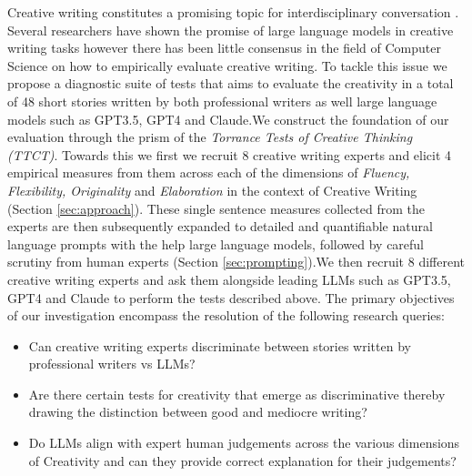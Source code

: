 Creative writing constitutes a promising topic for interdisciplinary conversation \cite{Doyle1998TheWT}. Several researchers have shown the promise of large language models in creative writing tasks \cite{mirowski2023cowriting,yang2022re3,lee2022coauthor} however there has been little consensus in the field of Computer Science on how to empirically evaluate creative writing. To tackle this issue we propose a diagnostic suite of tests that aims to evaluate the creativity in a total of 48 short stories written by both professional writers as well large language models such as GPT3.5, GPT4 and Claude.We construct the foundation of our evaluation through the prism of the \textit{Torrance Tests of Creative Thinking (TTCT)}. Towards this we first we recruit 8 creative writing experts and elicit 4 empirical measures from them across each of the dimensions of \textit{Fluency, Flexibility, Originality} and \textit{Elaboration} in the context of Creative Writing (Section \ref{sec:approach}). These single sentence measures collected from the experts are then subsequently expanded to detailed and quantifiable natural language prompts with the help large language models, followed by careful scrutiny from human experts (Section \ref{sec:prompting}).We then recruit 8 different creative writing experts and ask them alongside leading LLMs such as GPT3.5, GPT4 and Claude to perform the tests described above. The primary objectives of our investigation encompass the resolution of the following research queries:

\begin{itemize}
    \item Can creative writing experts discriminate between stories written by professional writers vs LLMs? 
    \item Are there certain tests for creativity that emerge as discriminative thereby drawing the distinction between good and mediocre writing?
    \item Do LLMs align with expert human judgements across the various dimensions of Creativity and can they provide correct explanation for their judgements?
\end{itemize}



